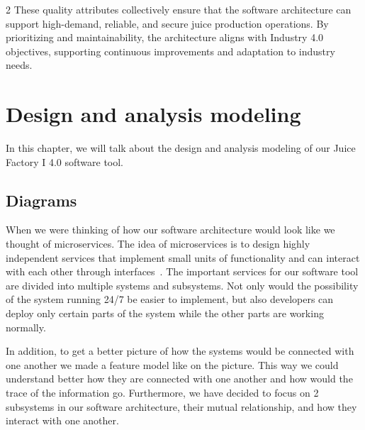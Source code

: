 \documentclass{article}
\begin{document}
\begin{multicols}{2}
These quality attributes collectively ensure that the software architecture can support high-demand, reliable, and secure juice production operations. By prioritizing 
and maintainability, the architecture aligns with Industry 4.0 objectives, supporting continuous improvements and adaptation to industry needs.

\section{Design and analysis modeling}
\color{blue}


\color{black}

In this chapter, we will talk about the design and analysis modeling of our Juice Factory I 4.0 software tool. 
\subsection{Diagrams}
When we were thinking of how our software architecture would look like we thought of microservices. The idea of microservices is to design highly independent services that implement small units of functionality and can interact with each other through interfaces~\cite{b6}. The important services for our software tool are divided into multiple systems and subsystems. Not only would the possibility of the system running 24/7 be easier to implement, but also developers can deploy only certain parts of the system while the other parts are working normally.

In addition, to get a better picture of how the systems would be connected with one another we made a feature model like on the picture. This way we could understand better how they are connected with one another and how would the trace of the information go. Furthermore, we have decided to focus on 2 subsystems in our software architecture, their mutual relationship, and how they interact with one another. 


\end{multicols}
\end{document}
